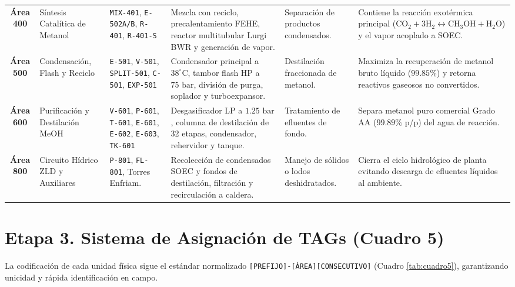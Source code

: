 \documentclass[10pt,letterpaper]{article}
\begin{document}
\begin{table}[H]
\begin{tabularx}{\textwidth}{c p{2.2cm} p{1.8cm} p{3.0cm} p{2.2cm} X}
\textbf{Área 400} & Síntesis Catalítica de Metanol & \texttt{MIX-401}, \texttt{E-502A/B}, \texttt{R-401}, \texttt{R-401-S} & Mezcla con reciclo, precalentamiento FEHE, reactor multitubular Lurgi BWR y generación de vapor. & Separación de productos condensados. & Contiene la reacción exotérmica principal ($\text{CO}_2+3\text{H}_2 \leftrightarrow \text{CH}_3\text{OH}+\text{H}_2\text{O}$) y el vapor acoplado a SOEC. \\
\textbf{Área 500} & Condensación, Flash y Reciclo & \texttt{E-501}, \texttt{V-501}, \texttt{SPLIT-501}, \texttt{C-501}, \texttt{EXP-501} & Condensador principal a $38^\circ\text{C}$, tambor flash HP a $75\text{ bar}$, división de purga, soplador y turboexpansor. & Destilación fraccionada de metanol. & Maximiza la recuperación de metanol bruto líquido ($99.85\%$) y retorna reactivos gaseosos no convertidos. \\
\textbf{Área 600} & Purificación y Destilación MeOH & \texttt{V-601}, \texttt{P-601}, \texttt{T-601}, \texttt{E-601}, \texttt{E-602}, \texttt{E-603}, \texttt{TK-601} & Desgasificador LP a $1.25\text{ bar}$, columna de destilación de 32 etapas, condensador, rehervidor y tanque. & Tratamiento de efluentes de fondo. & Separa metanol puro comercial Grado AA ($99.89\%$ p/p) del agua de reacción. \\
\textbf{Área 800} & Circuito Hídrico ZLD y Auxiliares & \texttt{P-801}, \texttt{FL-801}, Torres Enfriam. & Recolección de condensados SOEC y fondos de destilación, filtración y recirculación a caldera. & Manejo de sólidos o lodos deshidratados. & Cierra el ciclo hidrológico de planta evitando descarga de efluentes líquidos al ambiente. \\
\bottomrule
\end{tabularx}
\end{table}

\newpage
\section{Etapa 3. Sistema de Asignación de TAGs (Cuadro 5)}

La codificación de cada unidad física sigue el estándar normalizado \texttt{[PREFIJO]-[ÁREA][CONSECUTIVO]} (Cuadro \ref{tab:cuadro5}), garantizando unicidad y rápida identificación en campo.
\end{document}
